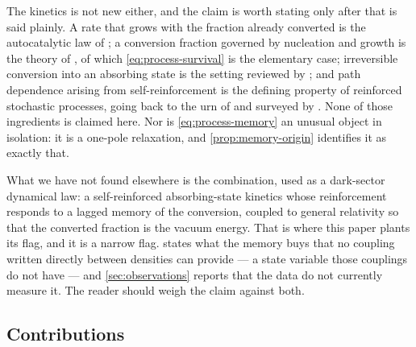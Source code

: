 The kinetics is not new either, and the claim is worth stating only after that
is said plainly. A rate that grows with the fraction already converted is the
autocatalytic law of \textcite{prout1944_thermal}; a conversion fraction
governed by nucleation and growth is the theory of
\textcite{avrami1939_kinetics}, of which \cref{eq:process-survival} is the
elementary case; irreversible conversion into an absorbing state is the setting
reviewed by \textcite{hinrichsen2000_cond-mat0001070}; and path dependence
arising from self-reinforcement is the defining property of reinforced
stochastic processes, going back to the urn of
\textcite{eggenberger1923_urn} and surveyed by
\textcite{pemantle2007_reinforcement}. None of those ingredients is claimed
here. Nor is \cref{eq:process-memory} an unusual object in isolation: it is a
one-pole relaxation, and \cref{prop:memory-origin} identifies it as exactly
that.

What we have not found elsewhere is the combination, used as a dark-sector
dynamical law: a self-reinforced absorbing-state kinetics whose reinforcement
responds to a lagged memory of the conversion, coupled to general relativity so
that the converted fraction is the vacuum energy. That is where this paper
plants its flag, and it is a narrow flag.  states what the
memory buys that no coupling written directly between densities can provide ---
a state variable those couplings do not have --- and \cref{sec:observations}
reports that the data do not currently measure it. The reader should weigh the
claim against both.

\subsection{Contributions}\label{sec:intro-contributions}


